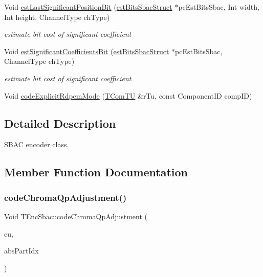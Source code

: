 \begin{DoxyCompactItemize}
\mbox{\label{class_t_enc_sbac_a89da30330a27aabf7f9b0fdafc03a2cd}} 
Void \hyperlink{class_t_enc_sbac_a89da30330a27aabf7f9b0fdafc03a2cd}{est\+Last\+Significant\+Position\+Bit} (\hyperlink{structest_bits_sbac_struct}{est\+Bits\+Sbac\+Struct} $\ast$pc\+Est\+Bits\+Sbac, Int width, Int height, Channel\+Type ch\+Type)
\begin{DoxyCompactList}\small\item\em estimate bit cost of significant coefficient \end{DoxyCompactList}\item 
\mbox{\label{class_t_enc_sbac_a53c04454a86cd00a8d1e88a90764326a}} 
Void \hyperlink{class_t_enc_sbac_a53c04454a86cd00a8d1e88a90764326a}{est\+Significant\+Coefficients\+Bit} (\hyperlink{structest_bits_sbac_struct}{est\+Bits\+Sbac\+Struct} $\ast$pc\+Est\+Bits\+Sbac, Channel\+Type ch\+Type)
\begin{DoxyCompactList}\small\item\em estimate bit cost of significant coefficient \end{DoxyCompactList}\item 
Void \hyperlink{class_t_enc_sbac_abce0153f9a8086cca9310bdf1db88740}{code\+Explicit\+Rdpcm\+Mode} (\hyperlink{class_t_com_t_u}{T\+Com\+TU} \&r\+Tu, const Component\+ID comp\+ID)
\end{DoxyCompactItemize}


\subsection{Detailed Description}
S\+B\+AC encoder class. 

\subsection{Member Function Documentation}
\mbox{\label{class_t_enc_sbac_a2bfc5581dab9d69768065390da483e07}} 
\subsubsection{\texorpdfstring{code\+Chroma\+Qp\+Adjustment()}{codeChromaQpAdjustment()}}
{\footnotesize\ttfamily Void T\+Enc\+Sbac\+::code\+Chroma\+Qp\+Adjustment (\begin{DoxyParamCaption}\item[{\hyperlink{class_t_com_data_c_u}{T\+Com\+Data\+CU} $\ast$}]{cu,  }\item[{U\+Int}]{abs\+Part\+Idx }\end{DoxyParamCaption})\hspace{0.3cm}{\ttfamily [virtual]}}

